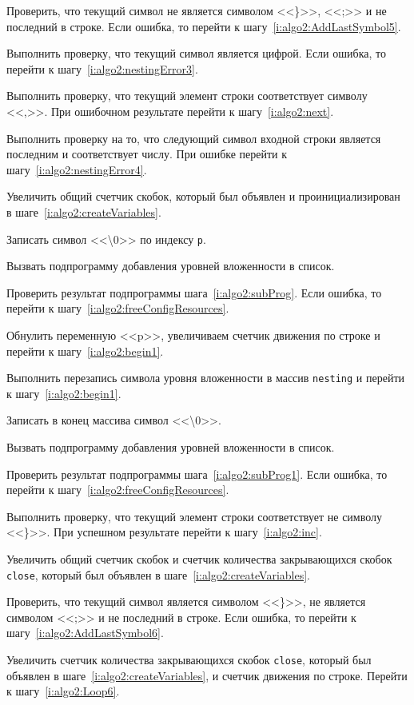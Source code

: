 \begin{enumerate_step}
    \item \label{i:algo2:begin1} Проверить, что текущий символ не является символом <<\}>>, <<;>> и не последний в строке. Если ошибка, то перейти к шагу~\ref{i:algo2:AddLastSymbol5}.
    \item Выполнить проверку, что текущий символ является цифрой. Если ошибка, то перейти к шагу~\ref{i:algo2:nestingError3}.
    \item Выполнить проверку, что текущий элемент строки соответствует символу <<,>>. При ошибочном результате перейти к шагу~\ref{i:algo2:next}.
    \item Выполнить проверку на то, что следующий символ входной строки является последним и соответствует числу. При ошибке перейти к шагу~\ref{i:algo2:nestingError4}.
    \item Увеличить общий счетчик скобок, который был объявлен и проинициализирован в шаге~\ref{i:algo2:createVariables}.
    \item Записать символ <<\textbackslash 0>> по индексу \lstinline{p}.
    \item \label{i:algo2:subProg} Вызвать подпрограмму добавления уровней вложенности в список.
    \item Проверить результат подпрограммы шага~\ref{i:algo2:subProg}. Если ошибка, то перейти к шагу~\ref{i:algo2:freeConfigResources}.
    \item Обнулить переменную <<p>>, увеличиваем счетчик движения по строке и перейти к шагу~\ref{i:algo2:begin1}.
    \item \label{i:algo2:next} Выполнить перезапись символа уровня вложенности в массив \lstinline{nesting} и перейти к шагу~\ref{i:algo2:begin1}.
    \item \label{i:algo2:AddLastSymbol5} Записать в конец массива символ <<\textbackslash 0>>.
    \item \label{i:algo2:subProg1} Вызвать подпрограмму добавления уровней вложенности в список.
    \item Проверить результат подпрограммы шага~\ref{i:algo2:subProg1}. Если ошибка, то перейти к шагу~\ref{i:algo2:freeConfigResources}.
    \item Выполнить проверку, что текущий элемент строки соответствует не символу <<\}>>. При успешном результате перейти к шагу~\ref{i:algo2:inc}.
    \item \label{i:algo2:inc} Увеличить общий счетчик скобок и счетчик количества закрывающихся скобок \lstinline{close}, который был объявлен в шаге~\ref{i:algo2:createVariables}.
    \item \label{i:algo2:Loop6} Проверить, что текущий символ является символом <<\}>>, не является символом <<;>> и не последний в строке. Если ошибка, то перейти к шагу~\ref{i:algo2:AddLastSymbol6}.
    \item Увеличить счетчик количества закрывающихся скобок \lstinline{close}, который был объявлен в шаге~\ref{i:algo2:createVariables}, и счетчик движения по строке. Перейти к шагу~\ref{i:algo2:Loop6}.


\end{enumerate_step}
